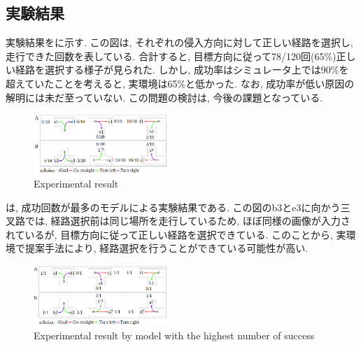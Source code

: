 \documentclass[10pt]{jarticle}
\begin{document}
    \subsection{実験結果}   
    実験結果をに示す. この図は, それぞれの侵入方向に対して正しい経路を選択し, 走行できた回数を表している. 合計すると, 目標方向に従って78/120回(65\%)正しい経路を選択する様子が見られた. しかし, 成功率はシミュレータ上では90\%を超えていたことを考えると, 実環境は65\%と低かった. なお, 成功率が低い原因の解明には未だ至っていない. この問題の検討は, 今後の課題となっている.
    \begin{center}
        \begin{figure}[h]
            \centering
            \includegraphics[width=0.45\textwidth]{./fig/real_result.png}
            \caption{Experimental result}
            \label{fig:result1}
        \end{figure}
    \end{center}
    \vspace{-0.9cm}
    は, 成功回数が最多のモデルによる実験結果である. この図のb3とe3に向かう三叉路では, 経路選択前は同じ場所を走行しているため, ほぼ同様の画像が入力されているが, 目標方向に従って正しい経路を選択できている. このことから, 実環境で提案手法により, 経路選択を行うことができている可能性が高い. 
    
    \begin{center}
        \begin{figure}[h]
            \centering
            \includegraphics[width=0.45\textwidth]{./fig/real_model3.png}
            \caption{Experimental result by model with the highest number of success}
            \label{fig:result2}
        \end{figure}
    \end{center}

    \vspace{-1.0cm}
\end{document}
